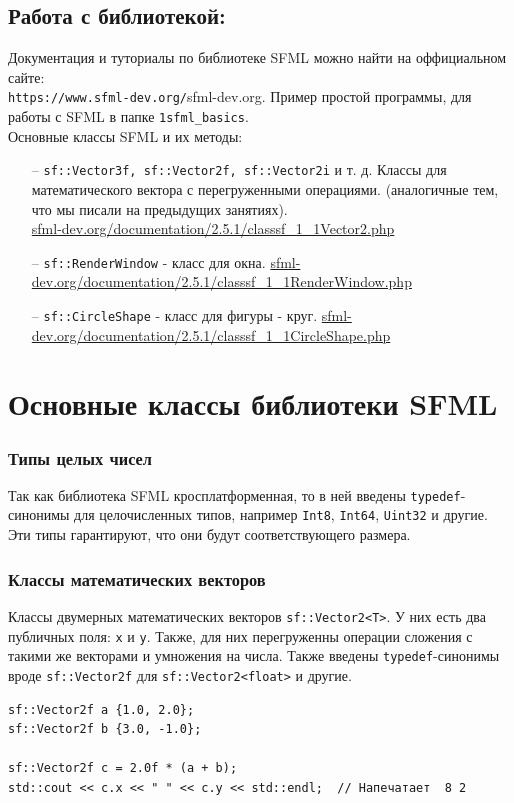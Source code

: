 \documentclass{article}
\begin{document}
\subsection*{Работа с библиотекой:}
Документация и туториалы по библиотеке SFML можно найти на оффициальном сайте:\\ \texttt{https://www.sfml-dev.org/}{sfml-dev.org}. Пример простой программы, для работы с SFML в папке \texttt{1sfml\_basics}. \\
Основные классы SFML и их методы:
\begin{itemize}
\item[--] \texttt{sf::Vector3f, sf::Vector2f, sf::Vector2i} и т. д. Классы для математического вектора с перегруженными операциями. (аналогичные тем, что мы писали на предыдущих занятиях). \\
\href{https://www.sfml-dev.org/documentation/2.5.1/classsf_1_1Vector2.php}{sfml-dev.org/documentation/2.5.1/classsf\_1\_1Vector2.php}
\item[--] \texttt{sf::RenderWindow} - класс для окна.
\href{https://www.sfml-dev.org/documentation/2.5.1/classsf_1_1RenderWindow.php}{sfml-dev.org/documentation/2.5.1/classsf\_1\_1RenderWindow.php}
\item[--] \texttt{sf::CircleShape} - класс для фигуры - круг.
\href{https://www.sfml-dev.org/documentation/2.5.1/classsf_1_1CircleShape.php}{sfml-dev.org/documentation/2.5.1/classsf\_1\_1CircleShape.php}
\end{itemize}
\fi


\newpage
\section*{Основные классы библиотеки SFML}
\subsubsection*{Типы целых чисел}
Так как библиотека SFML кросплатформенная, то в ней введены \texttt{typedef}-синонимы для целочисленных типов, например \texttt{Int8}, \texttt{Int64}, \texttt{Uint32} и другие. Эти типы гарантируют, что они будут соответствующего размера.

\subsubsection*{Классы математических векторов}
Классы двумерных математических векторов \texttt{sf::Vector2<T>}. У них есть два публичных поля: \texttt{x} и \texttt{y}. Также, для них перегруженны операции сложения с такими же векторами и умножения на числа. Также введены \texttt{typedef}-синонимы вроде \texttt{sf::Vector2f} для \texttt{sf::Vector2<float>} и другие.
\begin{lstlisting}
sf::Vector2f a {1.0, 2.0};
sf::Vector2f b {3.0, -1.0};

sf::Vector2f c = 2.0f * (a + b);
std::cout << c.x << " " << c.y << std::endl;  // Напечатает  8 2
\end{lstlisting}
\end{document}
